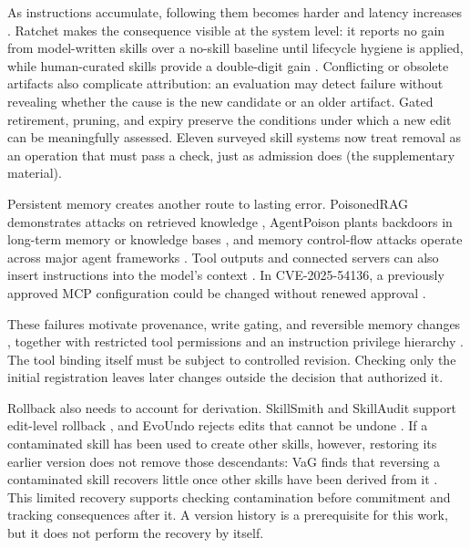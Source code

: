 As instructions accumulate, following them becomes harder and latency increases \citep{jaroslawicz2025ifscale}. Ratchet makes the consequence visible at the system level: it reports no gain from model-written skills over a no-skill baseline until lifecycle hygiene is applied, while human-curated skills provide a double-digit gain \citep{zhang2026ratchet}. Conflicting or obsolete artifacts also complicate attribution: an evaluation may detect failure without revealing whether the cause is the new candidate or an older artifact. Gated retirement, pruning, and expiry preserve the conditions under which a new edit can be meaningfully assessed. Eleven surveyed skill systems now treat removal as an operation that must pass a check, just as admission does \citep{zhang2026librarydrift, wei2026skillsmith, pu2026skillops, wang2026assay} (the supplementary material).

Persistent memory creates another route to lasting error. PoisonedRAG demonstrates attacks on retrieved knowledge \citep{zou2024poisonedrag}, AgentPoison plants backdoors in long-term memory or knowledge bases \citep{chen2024agentpoison}, and memory control-flow attacks operate across major agent frameworks \citep{xu2026mcfa}. Tool outputs and connected servers can also insert instructions into the model's context \citep{greshake2023injection, debenedetti2024agentdojo}. In CVE-2025-54136, a previously approved MCP configuration could be changed without renewed approval \citep{checkpoint2025mcpoison}.

These failures motivate provenance, write gating, and reversible memory changes \citep{su2026chronomem, yu2026rollbackrepair}, together with restricted tool permissions and an instruction privilege hierarchy \citep{wallace2024hierarchy}. The tool binding itself must be subject to controlled revision. Checking only the initial registration leaves later changes outside the decision that authorized it.

Rollback also needs to account for derivation. SkillSmith and SkillAudit support edit-level rollback \citep{wei2026skillsmith, gao2026skillaudit}, and EvoUndo rejects edits that cannot be undone \citep{sah2026evoundo}. If a contaminated skill has been used to create other skills, however, restoring its earlier version does not remove those descendants: VaG finds that reversing a contaminated skill recovers little once other skills have been derived from it \citep{shang2026vag}. This limited recovery supports checking contamination before commitment and tracking consequences after it. A version history is a prerequisite for this work, but it does not perform the recovery by itself.

